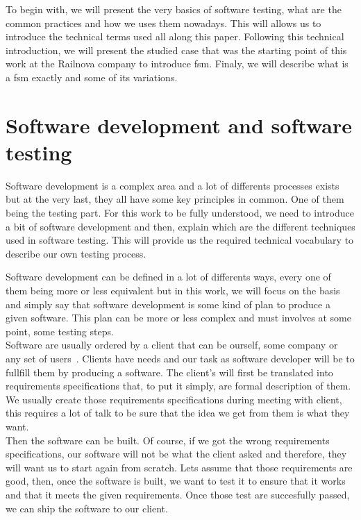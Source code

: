 \documentclass[12pt]{article}
\begin{document}
To begin with, we will present the very basics of software testing, what are the common practices and how we uses them nowadays. This will allows us to introduce the technical terms used all along this paper. Following this technical introduction, we will present the studied case that was the starting point of this work at the Railnova company to introduce \gls{fsm}. Finaly, we will describe what is a \gls{fsm} exactly and some of its variations.

\clearpage
\section{Software development and software testing}

Software development is a complex area and a lot of differents processes exists but at the very last, they all have some key principles in common. One of them being the testing part. For this work to be fully understood, we need to introduce a bit of software development and then, explain which are the different techniques used in software testing. This will provide us the required technical vocabulary to describe our own testing process.

Software development can be defined in a lot of differents ways, every one of them being more or less equivalent but in this work, we will focus on the basis and simply say that software development is some kind of plan to produce a given software. This plan can be more or less complex and must involves at some point, some testing steps.\\

Software are usually ordered by a client that can be ourself, some company or any set of users~\cite{SoftwareDevelopment:2016}. Clients have needs and our task as software developer will be to fullfill them by producing a software. The client's will first be translated into requirements specifications that, to put it simply, are formal description of them. We usually create those requirements specifications during meeting with client, this requires a lot of talk to be sure that the idea we get from them is what they want.\\

Then the software can be built. Of course, if we got the wrong requirements specifications, our software will not be what the client asked and therefore, they will want us to start again from scratch. Lets assume that those requirements are good, then, once the software is built, we want to test it to ensure that it works and that it meets the given requirements. Once those test are succesfully passed, we can ship the software to our client.\\
\end{document}
